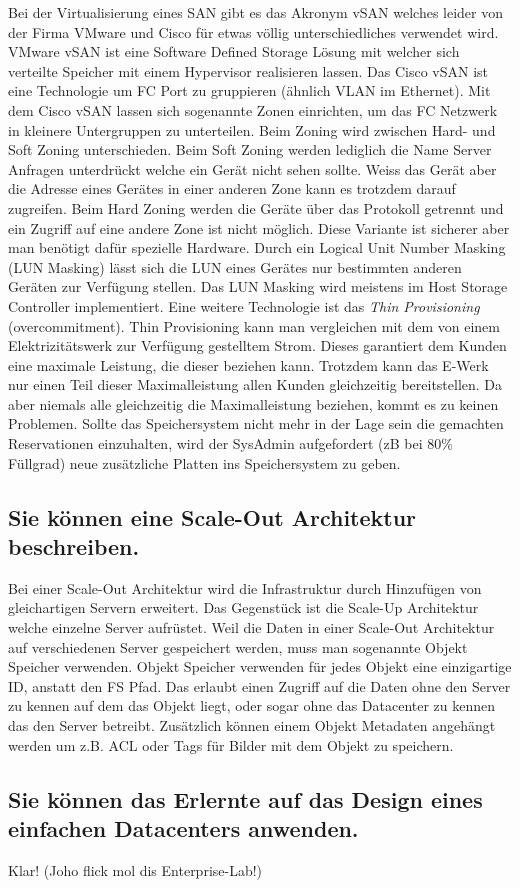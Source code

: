Bei der Virtualisierung eines SAN gibt es das Akronym vSAN welches leider von der Firma VMware und Cisco für etwas völlig unterschiedliches verwendet wird. VMware vSAN ist eine Software Defined Storage Lösung mit welcher sich verteilte Speicher mit einem Hypervisor realisieren lassen. 
Das Cisco vSAN ist eine Technologie um FC Port zu gruppieren (ähnlich VLAN im Ethernet). Mit dem Cisco vSAN lassen sich sogenannte Zonen einrichten, um das FC Netzwerk in kleinere Untergruppen zu unterteilen. Beim Zoning wird zwischen Hard-  und Soft Zoning unterschieden. Beim Soft Zoning werden lediglich die Name Server Anfragen unterdrückt welche ein Gerät nicht sehen sollte. Weiss das Gerät aber die Adresse eines Gerätes in einer anderen Zone kann es trotzdem darauf zugreifen. Beim Hard Zoning werden die Geräte über das Protokoll getrennt und ein Zugriff auf eine andere Zone ist nicht möglich. Diese Variante ist sicherer aber man benötigt dafür spezielle Hardware. Durch ein Logical Unit Number Masking (LUN Masking) lässt sich die LUN eines Gerätes nur bestimmten anderen Geräten zur Verfügung stellen. Das LUN Masking wird meistens im Host Storage Controller implementiert.
Eine weitere Technologie ist das \emph{Thin Provisioning} (overcommitment). Thin Provisioning kann man vergleichen mit dem von einem Elektrizitätswerk zur Verfügung gestelltem Strom. Dieses garantiert dem Kunden eine maximale Leistung, die dieser beziehen kann. Trotzdem kann das E-Werk nur einen Teil dieser Maximalleistung allen Kunden gleichzeitig bereitstellen. Da aber niemals alle gleichzeitig die Maximalleistung beziehen, kommt es zu keinen Problemen. Sollte das Speichersystem nicht mehr in der Lage sein die gemachten
Reservationen einzuhalten, wird der SysAdmin aufgefordert (zB bei 80\% Füllgrad) neue zusätzliche Platten ins Speichersystem zu geben.

\subsection{Sie können eine Scale-Out Architektur beschreiben.}

Bei einer Scale-Out Architektur wird die Infrastruktur durch Hinzufügen von gleichartigen Servern erweitert. Das Gegenstück ist die Scale-Up Architektur welche einzelne Server aufrüstet. Weil die Daten in einer Scale-Out Architektur auf verschiedenen Server gespeichert werden, muss man sogenannte Objekt Speicher verwenden. Objekt Speicher verwenden für jedes Objekt eine einzigartige ID, anstatt den FS Pfad. Das erlaubt einen Zugriff auf die Daten ohne den Server zu kennen auf dem das Objekt liegt, oder sogar ohne das Datacenter zu kennen das den Server betreibt. Zusätzlich können einem Objekt Metadaten angehängt werden um z.B. ACL oder Tags für Bilder mit dem Objekt zu speichern.

\subsection{Sie können das Erlernte auf das Design eines einfachen Datacenters anwenden.}

Klar! (Joho flick mol dis Enterprise-Lab!)